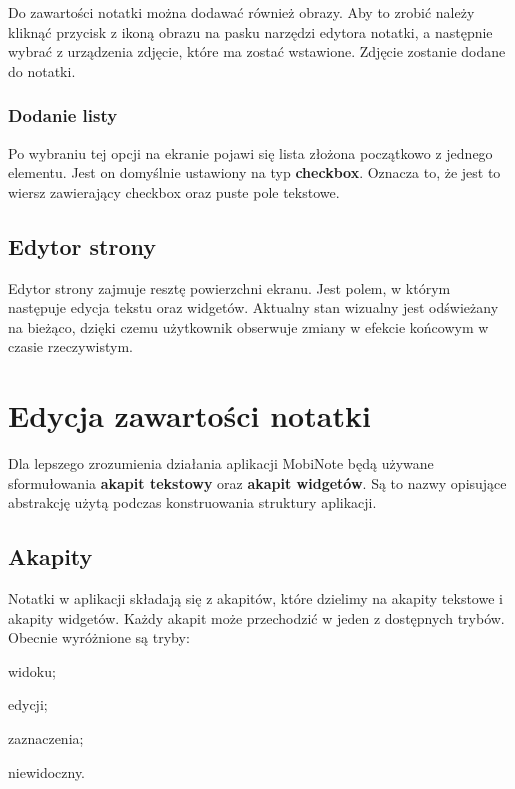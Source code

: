 Do zawartości notatki można dodawać również obrazy. Aby to zrobić należy kliknąć przycisk z ikoną obrazu na pasku narzędzi edytora notatki, a następnie wybrać z urządzenia zdjęcie, które ma zostać wstawione. Zdjęcie zostanie dodane do notatki.

\subsubsection{Dodanie listy}

Po wybraniu tej opcji na ekranie pojawi się lista złożona początkowo z jednego elementu.
Jest on domyślnie ustawiony na typ \textbf{checkbox}. Oznacza to, że jest to wiersz zawierający checkbox oraz puste pole tekstowe.

\subsection{Edytor strony}

Edytor strony zajmuje resztę powierzchni ekranu. Jest polem, w którym następuje edycja tekstu oraz widgetów. Aktualny stan wizualny jest odświeżany na bieżąco, dzięki czemu użytkownik obserwuje zmiany w efekcie końcowym w czasie rzeczywistym.



\section{Edycja zawartości notatki}

Dla lepszego zrozumienia działania aplikacji MobiNote będą używane sformułowania \textbf{akapit tekstowy} oraz \textbf{akapit widgetów}.
Są to nazwy opisujące abstrakcję użytą podczas konstruowania struktury aplikacji.

\subsection{Akapity}

Notatki w aplikacji składają się z akapitów, które dzielimy na akapity tekstowe i akapity widgetów.
Każdy akapit może przechodzić w jeden z dostępnych trybów.
Obecnie wyróżnione są tryby:

\begin{compactitem}
    \item widoku;
    \item edycji;
    \item zaznaczenia;
    \item niewidoczny.
\end{compactitem}


